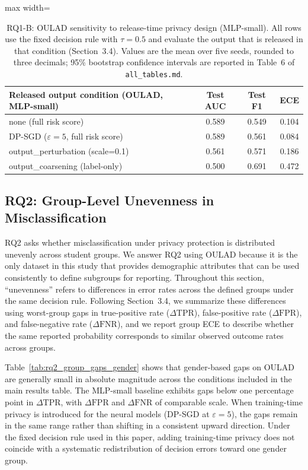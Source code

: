 \documentclass{edm_article}
\begin{document}
\begin{table}[t]
\centering
\caption{RQ1-B: OULAD sensitivity to release-time privacy design (MLP-small). All rows use the fixed decision rule with $\tau=0.5$ and evaluate the output that is released in that condition (Section~3.4). Values are the mean over five seeds, rounded to three decimals; 95\% bootstrap confidence intervals are reported in Table~6 of \texttt{all\_tables.md}.}
\label{tab:rq1_release_oulad}
\begin{adjustbox}{max width=\linewidth}
\begin{tabular}{@{}lccc@{}}
\toprule
Released output condition (OULAD, MLP-small) & Test AUC & Test F1 & ECE \\
\midrule
none (full risk score) & 0.589 & 0.549 & 0.104 \\
DP-SGD ($\varepsilon=5$, full risk score) & 0.589 & 0.561 & 0.084 \\
output\_perturbation (scale=0.1) & 0.561 & 0.571 & 0.186 \\
output\_coarsening (label-only) & 0.500 & 0.691 & 0.472 \\
\bottomrule
\end{tabular}
\end{adjustbox}
\end{table}


\subsection{RQ2: Group-Level Unevenness in Misclassification}

RQ2 asks whether misclassification under privacy protection is distributed unevenly across student groups. We answer RQ2 using OULAD because it is the only dataset in this study that provides demographic attributes that can be used consistently to define subgroups for reporting. Throughout this section, “unevenness” refers to differences in error rates across the defined groups under the same decision rule. Following Section~3.4, we summarize these differences using worst-group gaps in true-positive rate ($\Delta\mathrm{TPR}$), false-positive rate ($\Delta\mathrm{FPR}$), and false-negative rate ($\Delta\mathrm{FNR}$), and we report group ECE to describe whether the same reported probability corresponds to similar observed outcome rates across groups.

Table~\ref{tab:rq2_group_gaps_gender} shows that gender-based gaps on OULAD are generally small in absolute magnitude across the conditions included in the main results table. The MLP-small baseline exhibits gaps below one percentage point in $\Delta\mathrm{TPR}$, with $\Delta\mathrm{FPR}$ and $\Delta\mathrm{FNR}$ of comparable scale. When training-time privacy is introduced for the neural models (DP-SGD at $\varepsilon=5$), the gaps remain in the same range rather than shifting in a consistent upward direction. Under the fixed decision rule used in this paper, adding training-time privacy does not coincide with a systematic redistribution of decision errors toward one gender group.
\end{document}

